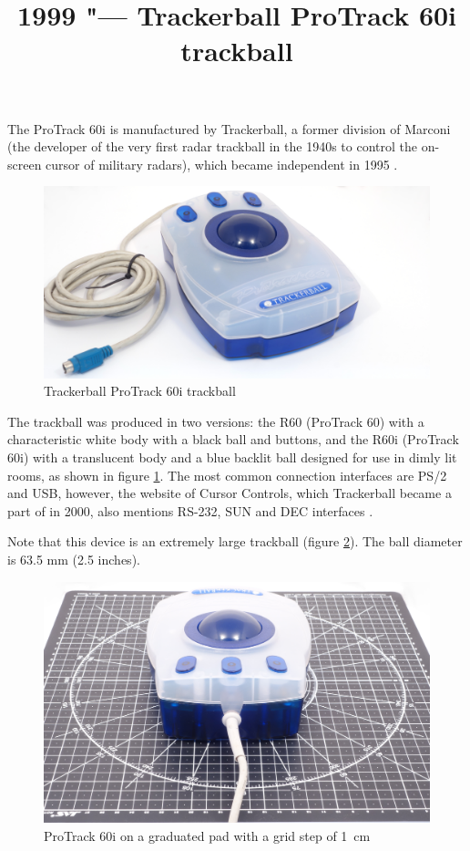 \documentclass[11pt, a4paper]{article}
\begin{document}
\title{1999 "--- Trackerball ProTrack 60i trackball}
\date{}
\maketitle

The ProTrack 60i is manufactured by Trackerball, a former division of Marconi (the developer of the very first radar trackball in the 1940s to control the on-screen cursor of military radars), which became independent in 1995 \cite{history}.

\begin{figure}[h]
    \centering
    \includegraphics[scale=0.3]{1999_protrack_60i/monstr1_30.jpg}
    \caption{Trackerball ProTrack 60i trackball}
    \label{fig:ProTrack60i}
\end{figure}

The trackball was produced in two versions: the R60 (ProTrack 60) with a characteristic white body with a black ball and buttons, and the R60i (ProTrack 60i) with a translucent body and a blue backlit ball designed for use in dimly lit rooms, as shown in figure \ref {fig:ProTrack60i}. The most common connection interfaces are PS/2 and USB, however, the website of Cursor Controls, which Trackerball became a part of in 2000, also mentions RS-232, SUN and DEC interfaces \cite{trackerball,cursorcontrols}.

Note that this device is an extremely large trackball (figure \ref{fig:ProTrack60iSize}). The ball diameter is 63.5 mm (2.5 inches).

\begin{figure}[h]
    \centering
    \includegraphics[scale=0.35]{1999_protrack_60i/monstr2.jpg}
    \caption{ProTrack 60i on a graduated pad with a grid step of 1~cm}
    \label{fig:ProTrack60iSize}
\end{figure}
\end{document}
